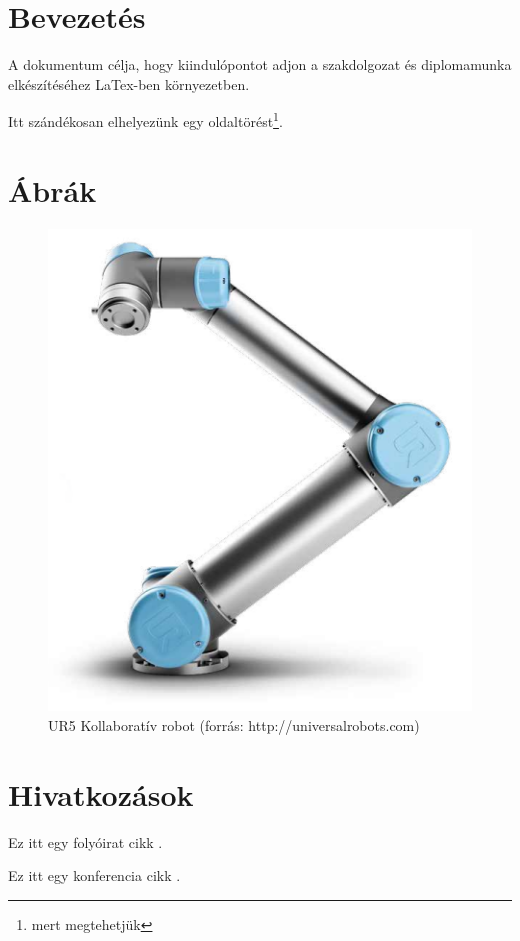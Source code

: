 \documentclass[12pt,a4paper]{article}
\author{Gipsz Jakab}
\begin{document}
	\maketitle
	\makeassigmentpage
	\makedeclaration
	\setcounter{page}{1} %
	
	\maketoc
	
	\section{Bevezetés}
	A dokumentum célja, hogy kiindulópontot adjon a szakdolgozat és diplomamunka elkészítéséhez LaTex-ben környezetben. 
	
	Itt szándékosan elhelyezünk egy oldaltörést\footnote{mert megtehetjük}.
	\pagebreak
	
	\section{Ábrák}
	
	\begin{figure}[h!]
		\centering
		\includegraphics[width=0.5\linewidth]{img/ur5robot.png}
		\caption[UR5 Koolabortív robot]{UR5 Kollaboratív robot (forrás: http://universalrobots.com)}
		\label{fig:robotik-bin-picking}
	\end{figure}
	
	\section{Hivatkozások}
	
	Ez itt egy folyóirat cikk \cite{journal-example}.
	
	Ez itt egy konferencia cikk \cite{conference-example}.
	
\end{document}
